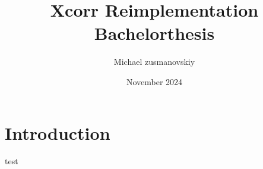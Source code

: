 \documentclass{article}
\title{Xcorr Reimplementation Bachelorthesis}
\author{Michael zusmanovskiy}
\date{November 2024}
\begin{document}
\maketitle

\section{Introduction}
test
\end{document}
